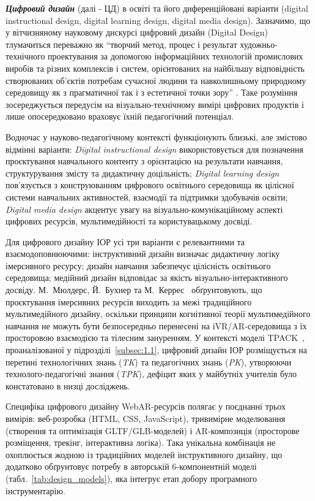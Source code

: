 \emph{\textbf{Цифровий дизайн}} (далі - ЦД) в освіті та його диференційовані варіанти (digital instructional design, digital learning design, digital media design). Зазначимо, що у вітчизняному науковому дискурсі цифровий дизайн (Digital Design) тлумачиться переважно як ``творчий метод, процес і результат художньо-технічного проектування за допомогою інформаційних технологій промислових виробів та різних комплексів і систем, орієнтованих на найбільшу відповідність створюваних об'єктів потребам сучасної людини та навколишньому природному середовищу як з прагматичної так і з естетичної точки зору'' \cite[c.~11]{Ziaziun2000Philosophy}. Таке розуміння зосереджується передусім на візуально-технічному вимірі цифрових продуктів і лише опосередковано враховує їхній педагогічний потенціал.

Водночас у науково-педагогічному контексті функціонують близькі, але змістово відмінні варіанти: \emph{Digital instructional design} використовується для позначення проєктування навчального контенту з орієнтацією на результати навчання, структурування змісту та дидактичну доцільність; \emph{Digital learning design} пов'язується з конструюванням цифрового освітнього середовища як цілісної системи навчальних активностей, взаємодії та підтримки здобувачів освіти; \emph{Digital media design} акцентує увагу на візуально-комунікаційному аспекті цифрових ресурсів, мультимедійності та користувацькому досвіді.

Для цифрового дизайну ІОР усі три варіанти є релевантними та взаємодоповнюючими: інструктивний дизайн визначає дидактичну логіку імерсивного ресурсу; дизайн навчання забезпечує цілісність освітнього середовища; медійний дизайн відповідає за якість візуально-інтерактивного досвіду. М.~Мюлдерс, Й.~Бухнер та М.~Керрес~\cite{Mulders2020Framework} обґрунтовують, що проєктування імерсивних ресурсів виходить за межі традиційного мультимедійного дизайну, оскільки принципи когнітивної теорії мультимедійного навчання не можуть бути безпосередньо перенесені на іVR/AR-середовища з їх просторовою взаємодією та тілесним зануренням. У контексті моделі TPACK~\cite{BeldaMedina2022TPACK}, проаналізованої у підрозділі~\ref{subsec:1.1}, цифровий дизайн ІОР розміщується на перетині технологічних знань (\emph{TK}) та педагогічних знань (\emph{PK}), утворюючи технолого-педагогічні знання (\emph{TPK}), дефіцит яких у майбутніх учителів було констатовано в низці досліджень.

Специфіка цифрового дизайну WebAR-ресурсів полягає у поєднанні трьох вимірів: веб-розробка (HTML, CSS, JavaScript), тривимірне моделювання (створення та оптимізація GLTF/GLB-моделей) і AR-композиція (просторове розміщення, трекінг, інтерактивна логіка). Така унікальна комбінація не охоплюється жодною із традиційних моделей інструктивного дизайну, що додатково обґрунтовує потребу в авторській 6-компонентній моделі (табл.~\ref{tab:design_models}), яка інтегрує етап добору програмного інструментарію.

